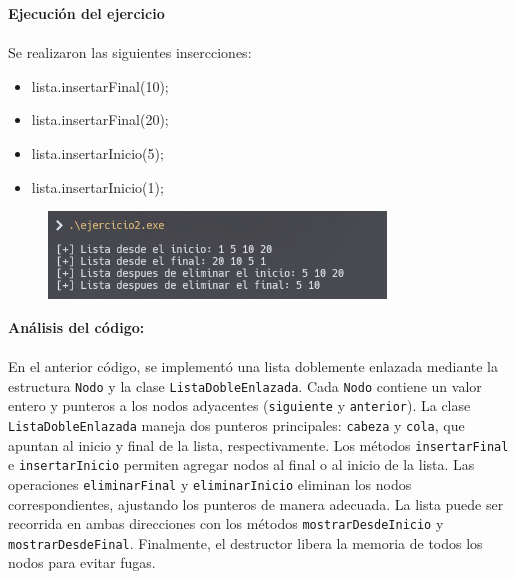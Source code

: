 \documentclass{article}
\begin{document}
        

        \textbf{Ejecución del ejercicio} \\\\
        Se realizaron las siguientes insercciones:
        \begin{itemize}
            \item lista.insertarFinal(10);
           \item lista.insertarFinal(20);
           \item lista.insertarInicio(5);
           \item lista.insertarInicio(1);
        \end{itemize}
        \begin{figure}[H]
        	\centering
         	\includegraphics[width=0.8\textwidth,keepaspectratio]{img/ejercicio2.png}
        \end{figure}

        \textbf{Análisis del código:}  \\\\
        En el anterior código, se implementó una lista doblemente enlazada mediante la estructura \texttt{Nodo} y la clase \texttt{ListaDobleEnlazada}. Cada \texttt{Nodo} contiene un valor entero y punteros a los nodos adyacentes (\texttt{siguiente} y \texttt{anterior}). La clase \texttt{ListaDobleEnlazada} maneja dos punteros principales: \texttt{cabeza} y \texttt{cola}, que apuntan al inicio y final de la lista, respectivamente. Los métodos \texttt{insertarFinal} e \texttt{insertarInicio} permiten agregar nodos al final o al inicio de la lista. Las operaciones \texttt{eliminarFinal} y \texttt{eliminarInicio} eliminan los nodos correspondientes, ajustando los punteros de manera adecuada. La lista puede ser recorrida en ambas direcciones con los métodos \texttt{mostrarDesdeInicio} y \texttt{mostrarDesdeFinal}. Finalmente, el destructor libera la memoria de todos los nodos para evitar fugas.
        
\clearpage
\end{document}
